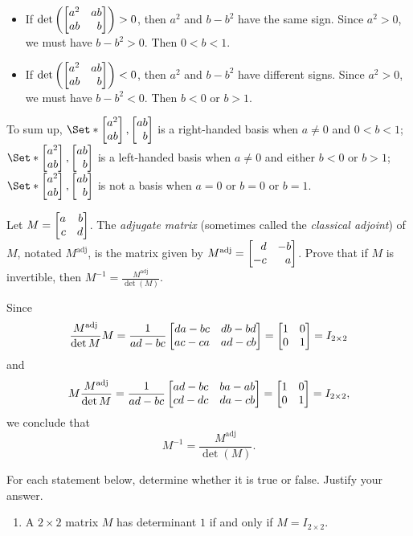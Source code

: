 \begin{exercises}
\begin{problist}
\begin{solution}
\begin{itemize}
		        \item If $\det\left(\mat{a^2 & ab \\ ab & b}\right)>0$, then $a^{2}$ and
			        $b-b^{2}$ have the same sign. Since $a^{2}>0$, we must have
			        $b-b^{2}>0$. Then $0<b<1$.

		        \item If $\det\left(\mat{a^2 & ab \\ ab & b}\right)<0$, then $a^{2}$ and
			        $b-b^{2}$ have different signs. Since $a^{2}>0$, we must have
			        $b-b^{2}<0$. Then $b<0$ or $b>1$.
	        \end{itemize}
	        To sum up, $\Set*{\mat{a^2 \\ ab},\mat{ab \\ b}}$ is a right-handed basis when
	        $a\ne 0$ and $0<b<1$; $\Set*{\mat{a^2 \\ ab},\mat{ab \\ b}}$ is a left-handed
	        basis when $a\ne 0$ and either $b<0$ or $b>1$; $\Set*{\mat{a^2 \\ ab},\mat{ab \\ b}}$
	        is not a basis when $a=0$ or $b=0$ or $b=1$.
        \end{solution}

		\prob Let $M=\mat{a & b \\ c & d}$. The \emph{adjugate matrix} (sometimes called the
		\emph{classical adjoint}) of $M$,
		notated $M^{\text{adj}}$, is the matrix given by $M^{\text{adj}}=\mat{d & -b \\ -c & a}$.
		Prove that if $M$ is invertible, then $\displaystyle M^{-1}=\frac{M^{\text{adj}}}{\det(M)}$.
        \begin{solution}
        Since \[\frac{M^{\text{adj}}}{\det{M}}M=\frac{1}{ad-bc}\mat{da-bc & db-bd \\ ac-ca& ad-cb}=\mat{1 & 0 \\ 0 & 1}=I_{2\times 2}\] and \[M\frac{M^{\text{adj}}}{\det{M}}=\frac{1}{ad-bc}\mat{ad-bc & ba-ab \\ cd-dc& da-cb}=\mat{1 & 0 \\ 0 & 1}=I_{2\times 2},\] we conclude that \[M^{-1}=\frac{M^{\text{adj}}}{\det(M)}.\]
        \end{solution}

		\prob For each statement below, determine whether it is true or false. Justify
		your answer.
		\begin{enumerate}
			\item A $2\times 2$ matrix $M$ has determinant $1$ if and only if $M=
				I_{2\times 2}$.


\end{enumerate}
\end{problist}
\end{exercises}
